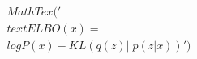\documentclass[preview]{standalone}
\begin{document}
\begin{align*}
MathTex('\\text{ELBO}(x) = \\log P(x) - KL(q(z) || p(z|x))')
\end{align*}
\end{document}
